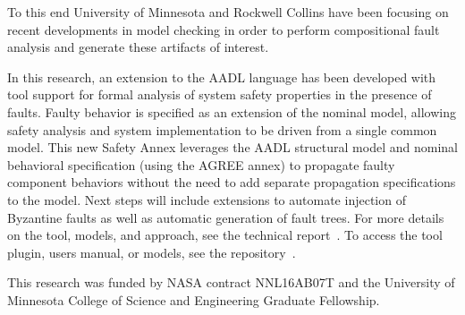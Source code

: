 To this end University of Minnesota and Rockwell Collins have been focusing on recent developments in model checking in order to perform compositional fault analysis and generate these artifacts of interest. 

In this research, an extension to the AADL language has been developed with tool support for formal analysis of system safety properties in the presence of faults. Faulty behavior is specified as an extension of the nominal model, allowing safety analysis and system implementation to be driven from a single common model. This new Safety Annex leverages the AADL structural model and nominal behavioral specification (using the AGREE annex) to propagate faulty component behaviors without the need to add separate propagation specifications to the model.   Next steps will include extensions to automate injection of Byzantine faults as well as automatic generation of fault trees.  For more details on the tool, models, and approach, see the technical report~\cite{SATechReport}. To access the tool plugin, users manual, or models, see the repository~\cite{SAGithub}. 


\vspace{2 mm}
 This research was funded by NASA contract NNL16AB07T and the University of Minnesota College of Science and Engineering Graduate Fellowship.



